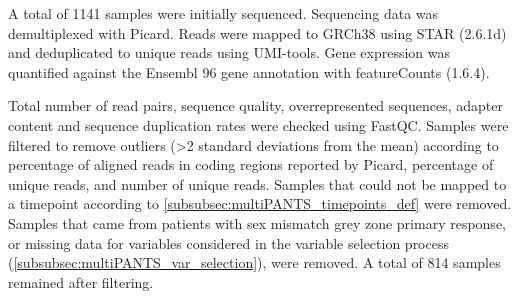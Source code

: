 A total of 1141 samples were initially sequenced.
Sequencing data was demultiplexed with Picard.
%
Reads were mapped to GRCh38 using STAR (2.6.1d) and deduplicated to unique reads using UMI-tools.
Gene expression was quantified against the Ensembl 96 gene annotation with featureCounts (1.6.4).

Total number of read pairs, sequence quality, overrepresented sequences, adapter content and sequence duplication rates were checked using FastQC.
Samples were filtered to remove outliers (\num{>2} standard deviations from the mean) according to percentage of aligned reads in coding regions reported by Picard, percentage of unique reads, and number of unique reads.
Samples that could not be mapped to a timepoint according to \autoref{subsubsec:multiPANTS_timepoints_def} were removed.
Samples that came from patients with 
sex mismatch
grey zone primary response, 
or missing data for variables considered in the variable selection process (\autoref{subsubsec:multiPANTS_var_selection}),
were removed.
A total of 814 samples remained after filtering.

